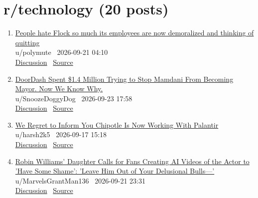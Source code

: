 \documentclass[11pt,a4paper]{article}
\begin{document}
\section*{r/technology \normalsize(20 posts)}
\begin{enumerate}
  \item \href{https://www.reddit.com/r/technology/comments/1wm2b9s/people_hate_flock_so_much_its_employees_are_now/}{People hate Flock so much its employees are now demoralized and thinking of quitting}\\ {\small u/polymute \textbullet\ 2026-09-21 04:10}\\ {\small \href{https://www.reddit.com/r/technology/comments/1wm2b9s/people_hate_flock_so_much_its_employees_are_now/}{Discussion} \textbullet\ \href{https://www.neowin.net/news/people-hate-flock-so-much-that-its-employees-are-now-demoralized-and-thinking-of-quitting/}{Source}}
  \item \href{https://www.reddit.com/r/technology/comments/1wod97k/doordash_spent_14_million_trying_to_stop_mamdani/}{DoorDash Spent \$1.4 Million Trying to Stop Mamdani From Becoming Mayor. Now We Know Why.}\\ {\small u/SnoozeDoggyDog \textbullet\ 2026-09-23 17:58}\\ {\small \href{https://www.reddit.com/r/technology/comments/1wod97k/doordash_spent_14_million_trying_to_stop_mamdani/}{Discussion} \textbullet\ \href{https://theintercept.com/2026/09/23/doordash-delivery-nyc-mamdani-wage-theft-settlement/}{Source}}
  \item \href{https://www.reddit.com/r/technology/comments/1wiww7d/we_regret_to_inform_you_chipotle_is_now_working/}{We Regret to Inform You Chipotle Is Now Working With Palantir}\\ {\small u/harsh2k5 \textbullet\ 2026-09-17 15:18}\\ {\small \href{https://www.reddit.com/r/technology/comments/1wiww7d/we_regret_to_inform_you_chipotle_is_now_working/}{Discussion} \textbullet\ \href{https://newrepublic.com/post/215501/chipotle-palantir}{Source}}
  \item \href{https://www.reddit.com/r/technology/comments/1wmt3h0/robin_williams_daughter_calls_for_fans_creating/}{Robin Williams' Daughter Calls for Fans Creating AI Videos of the Actor to 'Have Some Shame': 'Leave Him Out of Your Delusional Bulls---'}\\ {\small u/MarvelsGrantMan136 \textbullet\ 2026-09-21 23:31}\\ {\small \href{https://www.reddit.com/r/technology/comments/1wmt3h0/robin_williams_daughter_calls_for_fans_creating/}{Discussion} \textbullet\ \href{https://variety.com/2026/film/news/robin-williams-daughter-ai-videos-1236871568/}{Source}}

\end{enumerate}
\end{document}
